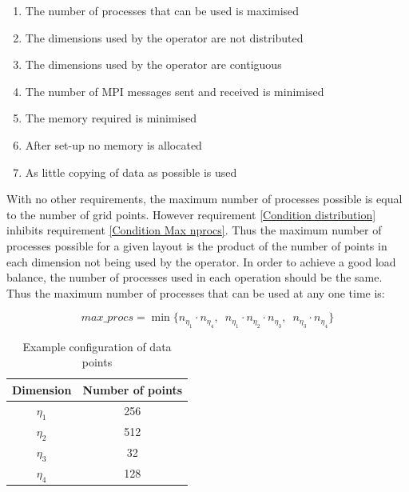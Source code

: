 \begin{tcolorbox} [enhanced,title=Requirements,attach boxed title to top left={xshift=10pt,yshift=-\tcboxedtitleheight/2},boxed title style={size=small}]

\begin{enumerate}
 \item The number of processes that can be used is maximised \label{Condition Max nprocs}
 \item The dimensions used by the operator are not distributed  \label{Condition distribution}
 \item The dimensions used by the operator are contiguous \label{Condition contiguous}
 \item The number of MPI messages sent and received is minimised \label{Condition MPI overhead}
 \item The memory required is minimised \label{Condition memory}
 \item After set-up no memory is allocated \label{Condition allocation}
 \item As little copying of data as possible is used \label{Condition copying}
\end{enumerate}

\end{tcolorbox}

With no other requirements, the maximum number of processes possible is equal to the number of grid points. However requirement \ref{Condition distribution} inhibits requirement \ref{Condition Max nprocs}. Thus the maximum number of processes possible for a given layout is the product of the number of points in each dimension not being used by the operator. In order to achieve a good load balance, the number of processes used in each operation should be the same. Thus the maximum number of processes that can be used at any one time is:

$$max\_procs = \min\{n_{\eta_1}\!\!\cdot n_{\eta_4},\, \, \, n_{\eta_1}\!\!\cdot n_{\eta_2}\!\! \cdot n_{\eta_3},\, \, \, n_{\eta_3}\!\!\cdot n_{\eta_4}\}$$

\begin{table}
\centering
 \begin{tabular}{|c|c|}
  \hline
  Dimension & Number of points\\
  \hline
  $\eta_1$ & 256\\
  \hline
  $\eta_2$ & 512\\
  \hline
  $\eta_3$ & 32\\
  \hline
  $\eta_4$ & 128\\
  \hline
 \end{tabular}
 \caption{\label{tab::Grid example} Example configuration of data points}
\end{table}

